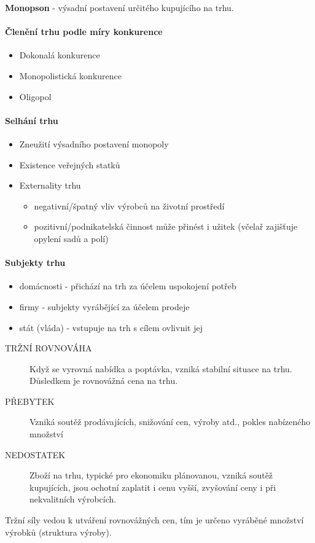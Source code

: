 \textbf{Monopson} - výsadní postavení určitého kupujícího na trhu.

\paragraph*{Členění trhu podle míry konkurence}
\begin{itemize}
    \item Dokonalá konkurence
    \item Monopolistická konkurence
    \item Oligopol
\end{itemize}

\paragraph*{Selhání trhu}
\begin{itemize}
    \item Zneužití výsadního postavení monopoly
    \item Existence veřejných statků
    \item Externality trhu
    \begin{itemize}
        \item negativní/špatný vliv výrobců na životní prostředí
        \item pozitivní/podnikatelská činnost může přinést i užitek (včelař zajišťuje opylení sadů a polí)
    \end{itemize}
\end{itemize}

\paragraph*{Subjekty trhu}
\begin{itemize}
    \item domácnosti - přichází na trh za účelem uspokojení potřeb
    \item firmy - subjekty vyrábějící za účelem prodeje
    \item stát (vláda) - vstupuje na trh s cílem ovlivnit jej
\end{itemize}

\begin{description}
    \item[TRŽNÍ ROVNOVÁHA] Když se vyrovná nabídka a poptávka, vzniká stabilní situace na trhu. Důsledkem je rovnovážná cena na trhu.
    \item[PŘEBYTEK] Vzniká soutěž prodávajících, snižování cen, výroby atd., pokles nabízeného množství
    \item[NEDOSTATEK] Zboží na trhu, typické pro ekonomiku plánovanou, vzniká soutěž kupujících, jsou ochotní zaplatit i cenu vyšší, zvyšování ceny i při nekvalitních výrobcích.
\end{description}

Tržní síly vedou k utváření rovnovážných cen, tím je určeno vyráběné množství výrobků (struktura výroby).

